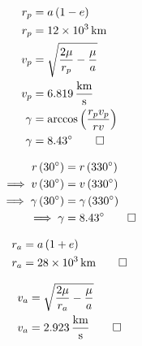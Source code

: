 \begin{hwkProblem}{4}{}
	\hwkPart
	\begin{align*}
		r_p & = a \left( 1 - e \right) \\
		r_p & = \qty{12e3}{\km} \\
		v_p & = \sqrt{\frac{2\mu}{r_p} - \frac{\mu}{a}} \\
		v_p & = \qty{6.819}{\km\per\s} \\
		\gamma & = \arccos{\left(\frac{r_p v_p}{rv}\right)} \\
		\gamma & = \qty{8.43}{\degree} \qed
	\end{align*}

	\hwkPart
	\begin{align*}
		r \left( \qty{30}{\degree} \right) & = r \left( \qty{330}{\degree} \right) \\
		\implies v \left( \qty{30}{\degree} \right) & = v \left( \qty{330}{\degree} \right) \\
		\implies \gamma \left( \qty{30}{\degree} \right) & = \gamma \left( \qty{330}{\degree} \right) \\
		\implies \gamma & = \qty{8.43}{\degree} \qed
	\end{align*}

	\hwkPart
	\begin{align*}
		r_a & = a \left( 1 + e \right) \\
		r_a & = \qty{28e3}{\km} \qed
	\end{align*}

	\hwkPart
	\begin{align*}
		v_a & = \sqrt{\frac{2\mu}{r_a} - \frac{\mu}{a}} \\
		v_a & = \qty{2.923}{\km\per\s} \qed
	\end{align*}
	
\end{hwkProblem}

